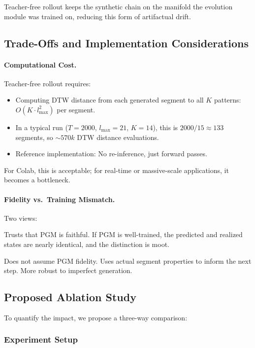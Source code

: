 Teacher-free rollout keeps the synthetic chain on the manifold the evolution module was trained on, reducing this form of artifactual drift.

\subsection{Trade-Offs and Implementation Considerations}

\paragraph{Computational Cost.} Teacher-free rollout requires:
\begin{itemize}[leftmargin=*,topsep=2pt,itemsep=2pt]
  \item Computing DTW distance from each generated segment to all $K$ patterns: $O(K \cdot l_{\max}^2)$ per segment.
  \item In a typical run ($T = 2000$, $l_{\max} = 21$, $K = 14$), this is $2000 / 15 \approx 133$ segments, so $\sim 570k$ DTW distance evaluations.
  \item Reference implementation: No re-inference, just forward passes.
\end{itemize}

For Colab, this is acceptable; for real-time or massive-scale applications, it becomes a bottleneck.

\paragraph{Fidelity vs.\ Training Mismatch.} Two views:
\begin{description}[leftmargin=!,labelwidth=\widthof{Teacher-free}]
  \item[Reference] Trusts that PGM is faithful. If PGM is well-trained, the predicted and realized states are nearly identical, and the distinction is moot.
  \item[Teacher-free] Does not assume PGM fidelity. Uses actual segment properties to inform the next step. More robust to imperfect generation.
\end{description}

\subsection{Proposed Ablation Study}

To quantify the impact, we propose a three-way comparison:

\subsubsection{Experiment Setup}

